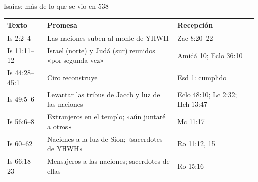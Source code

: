 \begin{frame}{Isaías: más de lo que se vio en 538}
\centering\footnotesize\renewcommand{\arraystretch}{1.2}
\begin{tabular}{>{\RaggedRight\arraybackslash}p{1.8cm}>{\RaggedRight\arraybackslash}p{5.6cm}>{\RaggedRight\arraybackslash}p{4.0cm}}
\toprule
\color{ladrillo}\bfseries Texto & \color{ladrillo}\bfseries Promesa & \color{ladrillo}\bfseries Recepción\\\midrule
Is 2:2--4 & Las naciones suben al monte de YHWH & Zac 8:20--22\\
Is 11:11--12 & Israel (norte) y Judá (sur) reunidos «por segunda vez» & Amidá 10; Eclo 36:10\\
Is 44:28--45:1 & Ciro reconstruye & Esd 1: cumplido\\
Is 49:5--6 & Levantar las tribus de Jacob y luz de las naciones & Eclo 48:10; Lc 2:32; Hch 13:47\\
Is 56:6--8 & Extranjeros en el templo; «aún juntaré a otros» & Mc 11:17\\
Is 60--62 & Naciones a la luz de Sion; «sacerdotes de YHWH» & Ro 11:12, 15\\
Is 66:18--23 & Mensajeros a las naciones; sacerdotes de ellas & Ro 15:16\\
\bottomrule
\end{tabular}
\elabpropia
\end{frame}

